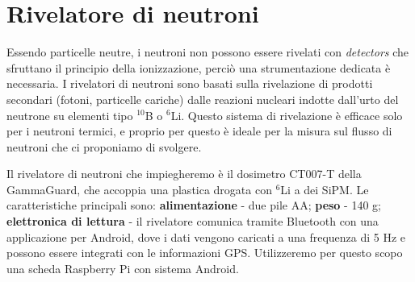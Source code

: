 \section{Rivelatore di neutroni}
Essendo particelle neutre, i neutroni non possono essere rivelati con \emph{detectors} che sfruttano il principio della ionizzazione, perciò una strumentazione dedicata è necessaria. I rivelatori di neutroni sono basati sulla rivelazione di prodotti secondari (fotoni, particelle cariche) dalle reazioni nucleari indotte dall'urto del neutrone su elementi tipo $^{10}$B o $^6$Li. Questo sistema di rivelazione è efficace solo per i neutroni termici, e proprio per questo è ideale per la misura sul flusso di neutroni che ci proponiamo di svolgere.  

Il rivelatore di neutroni che impiegheremo è il dosimetro CT007-T della GammaGuard, che accoppia una plastica drogata con $^6$Li a dei SiPM. Le caratteristiche principali sono: \textbf{alimentazione} - due pile AA; \textbf{peso} - 140 g; \textbf{elettronica di lettura} - il rivelatore comunica tramite Bluetooth con una applicazione per Android, dove i dati vengono caricati a una frequenza di 5 Hz e possono essere integrati con le informazioni GPS. Utilizzeremo per questo scopo una scheda Raspberry Pi con sistema Android.  

